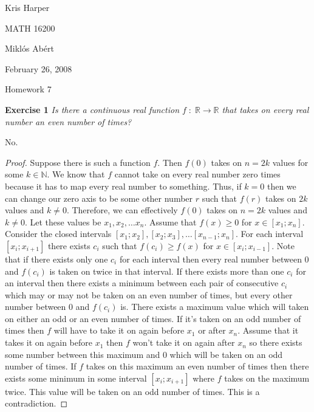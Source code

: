 \documentclass{article}
\begin{document}
\begin{flushright}
Kris Harper

MATH 16200

Mikl\'{o}s Ab\'{e}rt

February 26, 2008
\end{flushright}

\begin{center}
Homework 7
\end{center}

\begin{flushleft}

\textbf{Exercise 1}
\textsl{Is there a continuous real function $f \; : \; \mathbb{R} \rightarrow \mathbb{R}$ that takes on every real number an even number of times?}\newline

No.
\begin{proof}
Suppose there is such a function $f$. Then $f(0)$ takes on $n=2k$ values for some $k \in \mathbb{N}$.  We know that $f$ cannot take on every real number zero times because it has to map every real number to something. Thus, if $k=0$ then we can change our zero axis to be some other number $r$ such that $f(r)$ takes on $2k$ values and $k \neq 0$. Therefore, we can effectively $f(0)$ takes on $n=2k$ values and $k \neq 0$. Let these values be $x_1, x_2, \dots x_n$. Assume that $f(x) \geq 0$ for $x \in [x_1;x_n]$. Consider the closed intervals $[x_1;x_2], [x_2;x_3], \dots [x_{n-1};x_n]$. For each interval $[x_i;x_{i+1}]$ there exists $c_i$ such that $f(c_i) \geq f(x)$ for $x \in [x_i ; x_{i-1}]$. Note that if there exists only one $c_i$ for each interval then every real number between $0$ and $f(c_i)$ is taken on twice in that interval. If there exists more than one $c_i$ for an interval then there exists a minimum between each pair of consecutive $c_i$  which may or may not be taken on an even number of times, but every other number between $0$ and $f(c_i)$ is. There exists a maximum value which will taken on either an odd or an even number of times. If it's taken on an odd number of times then $f$ will have to take it on again before $x_1$ or after $x_n$. Assume that it takes it on again before $x_1$ then $f$ won't take it on again after $x_n$ so there exists some number between this maximum and $0$ which will be taken on an odd number of times. If $f$ takes on this maximum an even number of times then there exists some minimum in some interval $[x_i ; x_{i+1}]$ where $f$ takes on the maximum twice. This value will be taken on an odd number of times. This is a contradiction.
\end{proof}


\end{flushleft}
\end{document}
